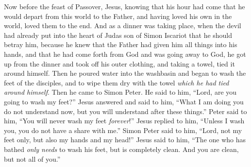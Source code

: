 \begin{biblechapter} %
 Now before the feast of Passover, Jesus, knowing that his hour had come that he would depart from this world to the Father, and having loved his own in the world, loved them to the end.
\verse And as a dinner was taking place, when the devil had already put into the heart of Judas son of Simon Iscariot that he should betray him,
\verse because he knew that the Father had given him all things into his hands, and that he had come forth from God and was going away to God,
\verse he got up from the dinner and took off his outer clothing, and taking a towel, tied it around himself.
\verse Then he poured water into the washbasin and began to wash the feet of the disciples, and to wipe them dry with the towel \textit{which he had tied around himself}.
\verse Then he came to Simon Peter. He said to him, “Lord, are you going to wash my feet?”
\verse Jesus answered and said to him, “What I am doing you do not understand now, but you will understand after these things.”
\verse Peter said to him, “You will never wash my feet \textit{forever}!” Jesus replied to him, “Unless I wash you, you do not have a share with me.”
\verse Simon Peter said to him, “Lord, not my feet only, but also my hands and my head!”
\verse Jesus said to him, “The one who has bathed \textit{only needs} to wash his feet, but is completely clean. And you are clean, but not all of you.”

\end{biblechapter}
